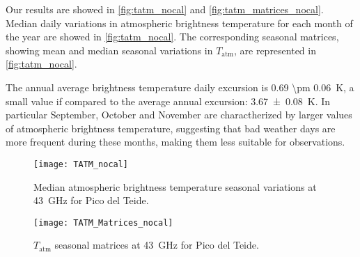 Our results are showed in \autoref{fig:tatm_nocal} and
\autoref{fig:tatm_matrices_nocal}. Median daily variations in atmospheric
brightness temperature for each month of the year are showed in
\autoref{fig:tatm_nocal}. The corresponding seasonal matrices, showing mean
and median seasonal variations in $T_\text{atm}$, are represented in
\autoref{fig:tatm_nocal}.

The annual average brightness temperature daily excursion is \SI{0.69 \pm
0.06}{\kelvin}, a small value if compared to the average annual
excursion: \SI{3.67 \pm 0.08}{\kelvin}. In particular
September, October and November are charactherized by larger values of
atmospheric brightness temperature, suggesting that bad weather days are more
frequent during these months, making them less suitable for observations.

\begin{figure}
        \centering
        \texttt{[image: TATM\_nocal]}
        \caption{Median atmospheric brightness temperature seasonal
        variations at \SI{43}{\giga\hertz} for Pico del Teide.}
        \label{fig:tatm_nocal}
\end{figure}

\begin{figure}
        \centering
        \texttt{[image: TATM\_Matrices\_nocal]}
        \caption{$T_\text{atm}$ seasonal matrices at \SI{43}{\giga\hertz}
        for Pico del Teide.}
        \label{fig:tatm_matrices_nocal}
\end{figure}

